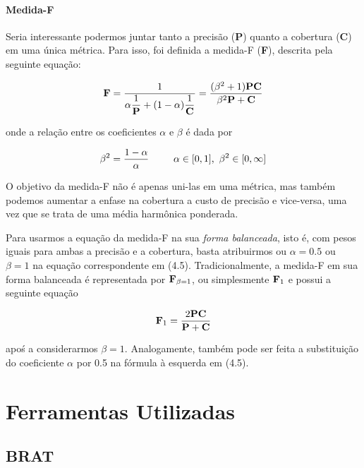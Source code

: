 \documentclass[11pt]{report}
\begin{document}
\subsubsection{Medida-F}

\indent\indent Seria interessante podermos juntar tanto a precisão (\textbf{P}) quanto a cobertura (\textbf{C}) em uma única métrica. Para isso, foi definida a medida-F (\textbf{F}), descrita
pela seguinte equação:

\begin{equation}
 \text{\textbf{F}} = \dfrac{1}{\alpha\dfrac{1}{\text{\textbf{P}}} + (1 - \alpha)\dfrac{1}{\text{\textbf{C}}}} = \dfrac{(\beta^2 + 1)\text{\textbf{PC}}}{\beta^2\text{\textbf{P}} + \text{\textbf{C}}}
\end{equation}

onde a relação entre os coeficientes $\alpha$ e $\beta$ é dada por

\begin{equation}
 \beta^2 = \dfrac{1 - \alpha}{\alpha} \enspace\enspace\enspace\enspace\enspace \alpha \in [0, 1]\text{,\enspace}\beta^2 \in [0, \infty]
\end{equation}

O objetivo da medida-F não é apenas uni-las em uma métrica, mas também podemos aumentar a enfase na cobertura a custo de precisão e vice-versa, uma vez que se trata de uma média harmônica ponderada. 

Para usarmos a equação da medida-F na sua \textit{forma balanceada}, isto é, com pesos iguais para ambas a precisão e a cobertura, basta atribuirmos ou $\alpha = 0.5$ ou  $\beta = 1$ na equação correspondente em (4.5). Tradicionalmente, a medida-F em sua forma balanceada é representada por $\text{\textbf{F}}_{\beta = 1}$, ou simplesmente $\text{\textbf{F}}_{1}$ e possui
a seguinte equação

\begin{equation}
 \text{\textbf{F}}_1 = \dfrac{2\text{\textbf{PC}}}{\text{\textbf{P}} + \text{\textbf{C}}}
\end{equation}

apoś a considerarmos $\beta = 1$. Analogamente, também pode ser feita a substituição do coeficiente $\alpha$ por 0.5 na fórmula à esquerda em (4.5).

\pagebreak
\chapter{Ferramentas Utilizadas}

\section{BRAT}
\end{document}
